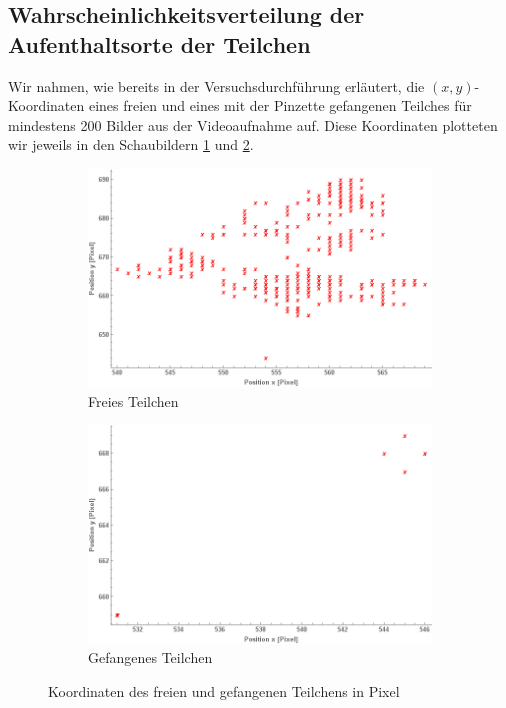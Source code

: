\documentclass[a4paper,titlepage]{scrartcl}
\numberwithin{equation}{section}
\begin{document}
\subsection{Wahrscheinlichkeitsverteilung der Aufenthaltsorte der Teilchen}
Wir nahmen, wie bereits in der Versuchsdurchführung erläutert, die $(x,y)$-Koordinaten eines freien und eines mit der Pinzette gefangenen Teilches für mindestens 200 Bilder aus der Videoaufnahme auf. Diese Koordinaten plotteten wir jeweils in den Schaubildern \ref{fig:frei} und \ref{fig:fest}.
\begin{figure}[H]
\centering
\begin{subfigure}{.5\textwidth}
  \centering
  \includegraphics[width=.95\linewidth]{frei.png}
  \caption{Freies Teilchen}
  \label{fig:frei}
\end{subfigure}%
\begin{subfigure}{.5\textwidth}
  \centering
  \includegraphics[width=.95\linewidth]{fest.png}
  \caption{Gefangenes Teilchen}
  \label{fig:fest}
\end{subfigure}
\caption{Koordinaten des freien und gefangenen Teilchens in Pixel}
\label{fig:koordinaten}
\end{figure}
\end{document}
